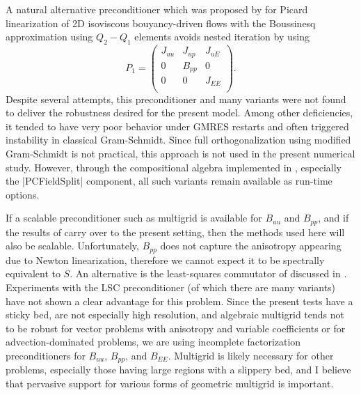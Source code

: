 A natural alternative preconditioner which was proposed by \citet{elman2011bouyancy} for Picard linearization of 2D isoviscous bouyancy-driven flows with the Boussinesq approximation using $Q_2-Q_1$ elements avoids nested iteration by using
\begin{equation*}
  P_1 =
  \begin{pmatrix}
    J_{uu} & J_{up} & J_{uE} \\
    0 & B_{pp} & 0 \\
    0 & 0 & J_{EE} \\
  \end{pmatrix} .
\end{equation*}
Despite several attempts, this preconditioner and many variants were not found to deliver the robustness desired for the present model.
Among other deficiencies, it tended to have very poor behavior under GMRES restarts and often triggered instability in classical Gram-Schmidt.
Since full orthogonalization using modified Gram-Schmidt is not practical, this approach is not used in the present numerical study.
However, through the compositional algebra implemented in {\PETSc}, especially the \cverb|PCFieldSplit| component, all such variants remain available as run-time options.

If a scalable preconditioner such as multigrid is available for $B_{uu}$ and $B_{pp}$, and if the results of \citet{olshanskii2006analysis} carry over to the present setting, then the methods used here will also be scalable.
Unfortunately, $B_{pp}$ does not capture the anisotropy appearing due to Newton linearization, therefore we cannot expect it to be spectrally equivalent to $S$.
An alternative is the least-squares commutator of \citet{elman2006bpb,elman1999bfbt} discussed in .
Experiments with the LSC preconditioner (of which there are many variants) have not shown a clear advantage for this problem.
Since the present tests have a sticky bed, are not especially high resolution, and algebraic multigrid tends not to be robust for vector problems with anisotropy and variable coefficients or for advection-dominated problems, we are using incomplete factorization preconditioners for $B_{uu}$, $B_{pp}$, and $B_{EE}$.
Multigrid is likely necessary for other problems, especially those having large regions with a slippery bed, and I believe that pervasive support for various forms of geometric multigrid is important.
